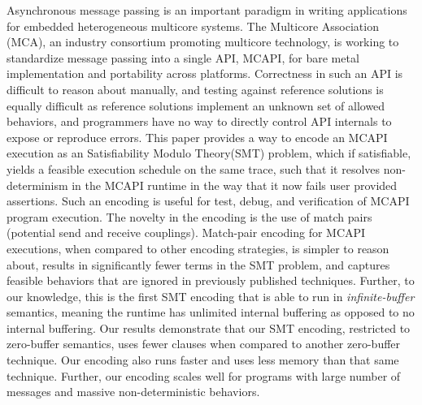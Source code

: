 Asynchronous message passing is an important paradigm in writing
applications for embedded heterogeneous multicore systems.  The
Multicore Association (MCA), an industry consortium promoting
multicore technology, is working to standardize message passing into a
single API, MCAPI, for bare metal implementation and portability
across platforms.  Correctness in such an API is difficult to reason
about manually, and testing against reference solutions is equally
difficult as reference solutions implement an unknown set of allowed
behaviors, and programmers have no way to directly control API
internals to expose or reproduce errors.  This paper provides a way to encode an MCAPI
execution as an Satisfiability Modulo Theory(SMT) problem, which if satisfiable, yields a feasible
execution schedule on the same trace,
such that it resolves non-determinism in the MCAPI runtime in the way that it now fails user provided assertions.
Such an encoding is useful for test, debug, and
verification of MCAPI program execution.  The novelty in the encoding
is the use of match pairs (potential send and receive couplings).  Match-pair encoding for
MCAPI executions, when compared to other encoding strategies, is
simpler to reason about, results in significantly fewer terms in the
SMT problem, and captures feasible behaviors that are ignored in
previously published techniques. Further, to our knowledge, this is the first SMT encoding  that is able to run in \textit{infinite-buffer} semantics, meaning the runtime has unlimited internal buffering as opposed to no internal buffering. %
Our results demonstrate that our SMT encoding, restricted to zero-buffer semantics, uses fewer clauses when compared to another zero-buffer technique. Our encoding also runs faster and uses less memory than that same technique. Further, our encoding scales well for programs with large number of messages and massive non-deterministic behaviors. 
